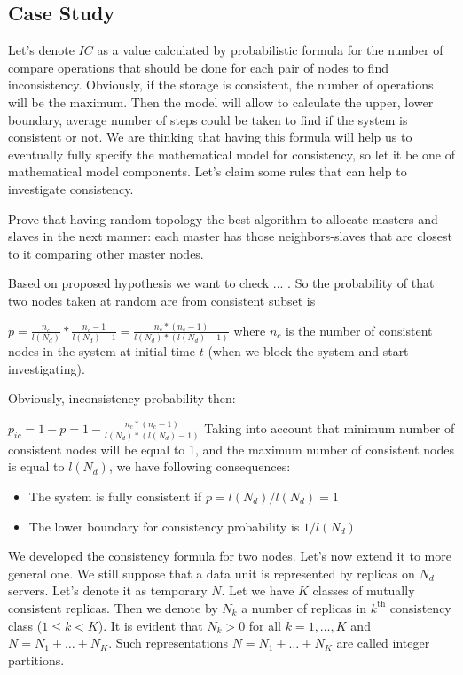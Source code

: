 \documentclass{llncs}
\begin{document}
\subsection{Case Study}\label{sec:experiments}

Let's denote  $IC$ as a value calculated by probabilistic formula for the number of compare operations that should be done for each pair of nodes to find inconsistency.
Obviously, if the storage is consistent, the number of operations will be the maximum.
Then the model will allow to calculate the upper, lower boundary, average number of steps could be
taken to find if the system is consistent or not.
We are thinking that having this formula will help us to eventually fully specify the mathematical model for consistency, so let it be one of mathematical model components. Let's claim some rules that can help to investigate
consistency.


{\color{red} Prove that having random topology the best algorithm to allocate masters and slaves
in the next manner: each master has those neighbors-slaves that are closest to it comparing
other master nodes.}

Based on proposed hypothesis we want to check ... .
So the probability of that two nodes taken at random are from consistent subset is

$p = \frac{n_c}{l(N_d)} * \frac{n_c - 1}{l(N_d) - 1} = \frac{n_c * (n_c - 1)}{l(N_d)* (l(N_d) -1)}$ where $n_c$ is the number of consistent nodes in the system at initial time $t$ (when we block the system and start investigating).

Obviously, inconsistency probability then:

$p_{ic} = 1 - p = 1 - \frac{n_c * (n_c - 1)}{l(N_d)* (l(N_d) -1)}$
Taking into account that minimum number of consistent nodes will be equal to 1, and the maximum number of consistent nodes is equal to $l(N_d)$, we have following consequences:
\begin{itemize}
\item The system is fully consistent if $p = l(N_d) / l(N_d) = 1$
\item The lower boundary for consistency probability is $1 / l(N_d)$
\end{itemize}

We developed the consistency formula for two nodes. Let's now extend it to more general one.
We still suppose that a data unit is represented by replicas on $N_d$ servers. Let's denote it as temporary $N$.
Let we have $K$ classes of mutually consistent replicas.
Then we denote by $N_k$ a number of replicas in $k^\mathrm{th}$ consistency class ($1\leq k<K$).
It is evident that $N_k>0$ for all $k=1,\ldots,K$ and $N=N_1+\ldots+N_K$.
Such representations $N=N_1+\ldots+N_K$ are called integer partitions.
\end{document}

